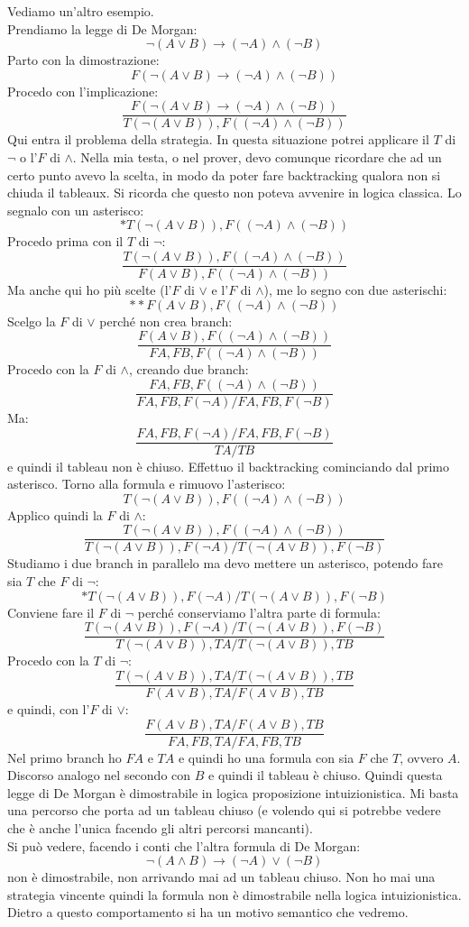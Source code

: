 \documentclass[a4paper,12pt, oneside]{book}
\begin{document}
\begin{esempio}
  Vediamo un'altro esempio.\\
  Prendiamo la legge di De Morgan:
  \[\neg (A\lor B)\to (\neg A)\land (\neg B)\]
  Parto con la dimostrazione:
  \[F(\neg (A\lor B)\to (\neg A)\land (\neg B))\]
  Procedo con l'implicazione:
  \[\frac{F(\neg (A\lor B)\to (\neg A)\land (\neg B))}{T(\neg (A\lor B)),F((\neg
      A)\land (\neg B))}\]
  Qui entra il problema della strategia. In questa situazione potrei applicare
  il $T$ di $\neg$ o l'$F$ di $\land$. Nella mia testa, o nel prover, devo
  comunque ricordare che ad un certo punto avevo la scelta, in modo da poter
  fare backtracking qualora non si chiuda il tableaux. Si ricorda che questo non
  poteva avvenire in logica classica. Lo segnalo con un
  asterisco:
  \[*T(\neg (A\lor B)),F((\neg A)\land (\neg B))\]
  Procedo prima con il $T$ di $\neg$:
  \[\frac{T(\neg (A\lor B)),F((\neg A)\land (\neg B))}{F(A\lor B), F((\neg
      A)\land (\neg B))}\]
  Ma anche qui ho più scelte (l'$F$ di $\lor$ e l'$F$ di $\land$), me lo segno
  con due asterischi: 
  \[**F(A\lor B), F((\neg A)\land (\neg B))\]
  Scelgo la $F$ di $\lor$ perché non crea branch:
  \[\frac{F(A\lor B), F((\neg A)\land (\neg B))}{FA, FB, F((\neg A)\land (\neg
      B))}\]
  Procedo con la $F$ di $\land$, creando due branch:
  \[\frac{FA, FB, F((\neg A)\land (\neg B))}{FA, FB, F(\neg A)/ FA, FB, F(\neg
      B)}\]
  Ma:
  \[\frac{FA, FB, F(\neg A)/ FA, FB, F(\neg B)}{TA/TB}\]
  e quindi il tableau non è chiuso. Effettuo il backtracking cominciando dal
  primo asterisco. Torno alla formula e rimuovo l'asterisco:
  \[T(\neg (A\lor B)),F((\neg A)\land (\neg B))\]
  Applico quindi la $F$ di $\land$:
  \[\frac{T(\neg (A\lor B)),F((\neg A)\land (\neg B))}{T(\neg (A\lor B)),F(\neg
      A)/T(\neg (A\lor B)),F(\neg B)}\]
  Studiamo i due branch in parallelo ma devo mettere un asterisco, potendo fare
  sia $T$ che $F$ di $\neg$:
  \[*T(\neg (A\lor B)),F(\neg A)/T(\neg (A\lor B)),F(\neg B)\]
  Conviene fare il $F$ di $\neg$ perché conserviamo l'altra parte di formula:
  \[\frac{T(\neg (A\lor B)),F(\neg A)/T(\neg (A\lor B)),F(\neg B)}{T(\neg (A\lor
      B)),TA/T(\neg (A\lor B)),TB}\] 
  Procedo con la $T$ di $\neg$:
  \[\frac{T(\neg (A\lor B)),TA/T(\neg (A\lor B)),TB}{F(A\lor B),TA/F(A\lor B),
      TB}\]
  e quindi, con l'$F$ di $\lor$:
  \[\frac{F(A\lor B),TA/F(A\lor B), TB}{FA,FB,TA/FA,FB,TB}\]
  Nel primo branch ho $FA$ e $TA$ e quindi ho una formula con sia $F$ che $T$,
  ovvero $A$. Discorso analogo nel secondo con $B$ e quindi il tableau è
  chiuso. Quindi questa legge di De Morgan è dimostrabile in logica
  proposizione intuizionistica. Mi basta una percorso che porta ad un
  tableau chiuso (e volendo qui si potrebbe vedere che è anche l'unica facendo
  gli altri percorsi mancanti). \\
  Si può vedere, facendo i conti che l'altra formula di De Morgan:
  \[\neg (A\land B)\to (\neg A)\lor (\neg B)\]
  non è dimostrabile, non arrivando mai ad un tableau chiuso. Non ho mai una
  strategia vincente  quindi la formula non è dimostrabile nella logica
  intuizionistica. Dietro a questo comportamento si ha un motivo semantico che
  vedremo.  
\end{esempio}
\end{document}
